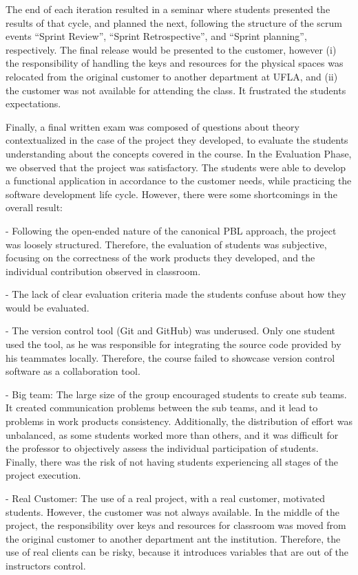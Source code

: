 The end of each iteration resulted in a seminar where students presented the results of that cycle, and planned the next, following the structure of the scrum events “Sprint Review”, “Sprint Retrospective”, and “Sprint planning”, respectively. The final release would be presented to the customer, however (i) the responsibility of handling the keys and resources for the physical spaces was relocated from the original customer to another department at UFLA, and (ii) the customer was not available for attending the class. It frustrated  the students expectations. 

Finally, a final written exam was composed of questions about theory contextualized in the case of the project they developed, to evaluate the students understanding about the concepts covered in the course.
In the Evaluation Phase, we observed that the project was satisfactory. The students were able to develop a functional application in accordance to the customer needs, while practicing the software development life cycle. However, there were some shortcomings in the overall result:

-	Following the open-ended nature of the canonical PBL approach, the project was loosely structured. Therefore, the evaluation of students was subjective, focusing on the correctness of the work products they developed, and the individual contribution observed in classroom. 

-	The lack of clear evaluation criteria made the students confuse about how they would be evaluated. 

-	The version control tool (Git and GitHub) was underused. Only one student used the tool, as he was responsible for integrating the source code provided by his teammates locally. Therefore, the course failed to showcase version control software as a collaboration tool.

-	Big team: The large size of the group encouraged students to create sub teams. It created communication problems between the sub teams, and it lead to problems in work products consistency. Additionally, the distribution of effort was unbalanced, as some students worked more than others, and it was difficult for the professor to objectively assess the individual participation of students. Finally, there was the risk of not having students experiencing all stages of the project execution.

-	Real Customer: The use of a real project, with a real customer, motivated students. However, the customer was not always available. In the middle of the project, the responsibility over keys and resources for classroom was moved from the original customer to another department ant the institution. Therefore, the use of real clients can be risky, because it introduces variables that are out of the instructors control.

